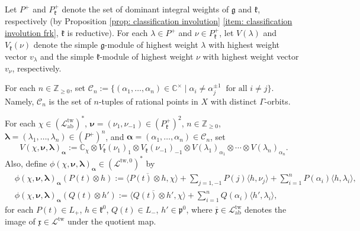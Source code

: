 \documentclass[12pt,a4paper]{amsart}
\theoremstyle{definition}
\numberwithin{equation}{subsection}
\begin{document}
Let $P^+$ and $P_\mathfrak{k}^+$ denote the set of dominant integral weights of $\mathfrak{g}$ and $\mathfrak{k}$, respectively (by Proposition \ref{prop: classification involution} \eqref{item: classification involution frk}, $\mathfrak{k}$ is reductive).
For each $\lambda \in P^+$ and $\nu \in P_\mathfrak{k}^+$, let $V(\lambda)$ and $V_\mathfrak{k}(\nu)$ denote the simple $\mathfrak{g}$-module of highest weight $\lambda$ with highest weight vector $v_\lambda$ and the simple $\mathfrak{k}$-module of highest weight $\nu$ with highest weight vector $v_\nu$, respectively.

For each $n \in \mathbb{Z}_{\geq 0}$, set $\mathcal{C}_n := \{ (\alpha_1,\dots,\alpha_n) \in \mathbb{C}^\times \mid \alpha_i \neq \alpha_j^{\pm 1} \ \text{ for all } i \neq j \}$.
Namely, $\mathcal{C}_n$ is the set of $n$-tuples of rational points in $X$ with distinct $\Gamma$-orbits.

For each $\chi \in (\mathcal{L}^{\mathrm{tw}}_\mathrm{ab})^*$, ${\boldsymbol \nu} = (\nu_1,\nu_{-1}) \in (P_\mathfrak{k}^+)^2$, $n \in \mathbb{Z}_{\geq 0}$, ${\boldsymbol \lambda} = ( \lambda_1,\dots,\lambda_n) \in (P^+)^n$, and ${\boldsymbol \alpha} = (\alpha_1,\dots,\alpha_n) \in \mathcal{C}_n$, set
\[
  V(\chi,{\boldsymbol \nu},{\boldsymbol \lambda})_{{\boldsymbol \alpha}} := \mathbb{C}_\chi \otimes V_\mathfrak{k}(\nu_1)_1 \otimes V_\mathfrak{k}(\nu_{-1})_{-1} \otimes V(\lambda_1)_{\alpha_1} \otimes \cdots \otimes V(\lambda_n)_{\alpha_n}.
\]
Also, define $\phi(\chi,{\boldsymbol \nu},{\boldsymbol \lambda})_{{\boldsymbol \alpha}} \in (\mathcal{L}^{\mathrm{tw},0})^*$ by
\begin{align*}
  &\phi(\chi,{\boldsymbol \nu},{\boldsymbol \lambda})_{{\boldsymbol \alpha}}(P(t) \otimes h)
  :=
  \langle \overline{P(t) \otimes h}, \chi \rangle
  +
  \sum_{j=1,-1}P(j) \langle h, \nu_j \rangle
  +
  \sum_{i=1}^n P(\alpha_i) \langle h, \lambda_i \rangle,\\
  &\phi(\chi,{\boldsymbol \nu},{\boldsymbol \lambda})_{{\boldsymbol \alpha}}(Q(t) \otimes h')
  :=
  \langle \overline{Q(t) \otimes h'}, \chi \rangle
  +
  \sum_{i=1}^n Q(\alpha_i) \langle h', \lambda_i \rangle,
\end{align*}
for each $P(t) \in L_+$, $h \in \mathfrak{k}^0$, $Q(t) \in L_-$, $h' \in \mathfrak{p}^0$, where $\overline{\mathfrak{x}} \in \mathcal{L}^{\mathrm{tw}}_\mathrm{ab}$ denotes the image of $\mathfrak{x} \in \mathcal{L}^{\mathrm{tw}}$ under the quotient map.
\end{document}
